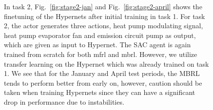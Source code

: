 \documentclass{article}
\begin{document}
\begin{figure}[H]
\begin{minipage}[t]{\textwidth}
    In task 2, Fig.~\ref{fig:stage2-jan} and Fig.~\ref{fig:stage2-april} shows the finetuning of the Hypernets after initial training in task 1.
    For task 2, the actor generates three actions, heat pump modulating signal, heat pump evaporator fan and emission circuit pump as output, which are given as input to Hypernet.
    The SAC agent is again trained from scratch for both \gls{mfrl} and \gls{mbrl}.
    However, we utilize transfer learning on the Hypernet which was already trained on task 1.
    We see that for the January and April test periods, the MBRL tends to perform better from early on, however, caution should be taken when training Hypernets since they can have a significant drop in performance due to instabilities. 
  \end{minipage}
  
\end{figure}
\end{document}
